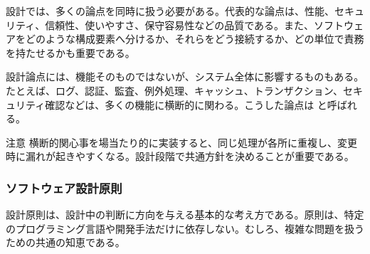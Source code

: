 設計では、多くの論点を同時に扱う必要がある。代表的な論点は、性能、セキュリティ、信頼性、使いやすさ、保守容易性などの品質である。また、ソフトウェアをどのような構成要素へ分けるか、それらをどう接続するか、どの単位で責務を持たせるかも重要である。

設計論点には、機能そのものではないが、システム全体に影響するものもある。たとえば、ログ、認証、監査、例外処理、キャッシュ、トランザクション、セキュリティ確認などは、多くの機能に横断的に関わる。こうした論点は と呼ばれる。

\begin{pointbox}{注意}
横断的関心事を場当たり的に実装すると、同じ処理が各所に重複し、変更時に漏れが起きやすくなる。設計段階で共通方針を決めることが重要である。
\end{pointbox}

\subsubsection{ソフトウェア設計原則}

設計原則は、設計中の判断に方向を与える基本的な考え方である。原則は、特定のプログラミング言語や開発手法だけに依存しない。むしろ、複雑な問題を扱うための共通の知恵である。

